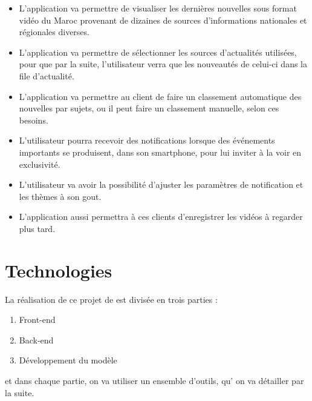 \begin{itemize}
\item L'application va permettre de visualiser les dernières nouvelles sous format vidéo du Maroc provenant de dizaines de sources d'informations nationales et régionales diverses.
\item L'application va permettre de sélectionner les sources d'actualités utilisées, pour que par la suite, l'utilisateur verra que les nouveautés de  celui-ci dans la file d'actualité.
\item L'application va permettre au client de faire  un classement automatique des nouvelles par sujets, ou il peut faire un classement manuelle, selon ces besoins.
\item L'utilisateur pourra recevoir des notifications lorsque des événements importants se produisent, dans son smartphone, pour lui inviter à la voir en exclusivité.
\item L'utilisateur va avoir la possibilité d'ajuster les paramètres de notification et les thèmes à son gout.
\item L'application aussi permettra à ces clients d'enregistrer les vidéos à regarder plus tard.
\end{itemize}


\section{Technologies}
La réalisation de ce projet de est divisée en trois parties :
\begin{enumerate}
 \item Front-end
 \item Back-end
 \item  Développement du modèle
 \end{enumerate} 
 et dans chaque partie, on va utiliser un ensemble d'outils, qu' on va détailler par la suite.
